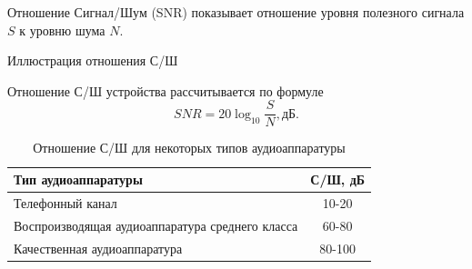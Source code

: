 \documentclass{beamer}
\begin{document}
\begin{frame}
Отношение Сигнал/Шум (SNR) показывает отношение уровня полезного сигнала $S$ к уровню шума $N$.
  \begin{block}{Иллюстрация отношения С/Ш}
  \end{block}
\end{frame}  
\begin{frame}  
Отношение С/Ш устройства рассчитывается по формуле
\[SNR=20 \log_{10}{\frac{S}{N}}, \text{дБ.}\]

\begin{table}
  \caption{Отношение С/Ш для некоторых типов аудиоаппаратуры}
  \begin{center}
  \begin{tabular}{|l|c|}
  \hline Тип аудиоаппаратуры & С/Ш, дБ \\
  \hline Телефонный канал & 10-20 \\
  \hline Воспроизводящая аудиоаппаратура среднего класса & 60-80 \\  
  \hline Качественная аудиоаппаратура & 80-100 \\  
  \hline
  \end{tabular}
  \end{center}  
  \label{table-noise-02}
\end{table}
\end{frame}
\end{document}

